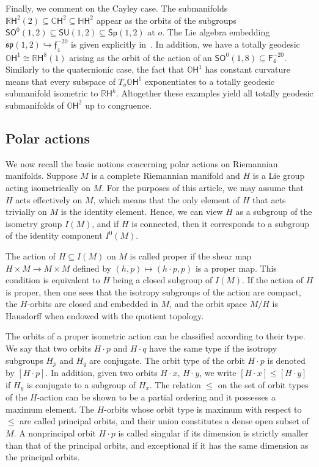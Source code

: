 \documentclass[12pt, a4paper]{amsart}
\newcommand{\g}{\mathfrak}
\newcommand{\s}{\mathsf}
\newcommand{\R}{\mathbb{R}}
\newcommand{\C}{\mathbb{C}}
\renewcommand{\H}{\mathbb{H}}
\renewcommand{\O}{\mathbb{O}}
\theoremstyle{definition}
\begin{document}
Finally, we comment on the Cayley case.
The submanifolds $\R\s{H}^2(2)\subseteq \C\s{H}^2\subseteq \H\s{H}^2$ appear as the orbits of the subgroups $\s{SO}^0(1,2)\subseteq \s{SU}(1,2)\subseteq \s{Sp}(1,2)$ at $o$.
The Lie algebra embedding $\g{sp}(1,2)\hookrightarrow\g{f}_4^{-20}$ is given explicitly in~\cite[Proposition~5.3]{kollross-octonions}.
In addition, we have a totally geodesic $\O\s{H}^1\cong \R\s{H}^8(1)$ arising as the orbit of the action of an $\s{SO}^0(1,8)\subseteq \s{F}_4^{-20}$.
Similarly to the quaternionic case, the fact that $\O\s{H}^1$ has constant curvature means that every subspace of $T_o\O\s{H}^1$ exponentiates to a totally geodesic submanifold isometric to $\R\s{H}^k$.
Altogether these examples yield all totally geodesic submanifolds of $\O\s{H}^2$
up to congruence.

\subsection{Polar actions}\label{sec:polar}\hfill

We now recall the basic notions concerning polar actions on Riemannian manifolds.
Suppose $M$ is a complete Riemannian manifold and $H$ is a Lie group acting isometrically on $M$.
For the purposes of this article, we may assume that $H$ acts effectively on $M$, which means that the only element of $H$ that acts trivially on $M$ is the identity element.
Hence, we can view $H$ as a subgroup of the isometry group $I(M)$, and if $H$ is connected, then it corresponds to a subgroup of the identity component $I^0(M)$.

The action of $H\subseteq I(M)$ on $M$ is called proper if the shear map $H\times M \to M \times M$ defined by $(h,p)\mapsto (h\cdot p, p)$ is a proper map.
This condition is equivalent to $H$ being a closed subgroup of $I(M)$.
If the action of $H$ is proper, then one sees that the isotropy subgroups of the action are compact, the $H$-orbits are closed and embedded in $M$, and the orbit space $M/H$ is Hausdorff when endowed with the quotient topology.

The orbits of a proper isometric action can be classified according to their type.
We say that two orbits $H\cdot p$ and $H\cdot q$ have the same type if the isotropy subgroups $H_p$ and $H_q$ are conjugate.
The orbit type of the orbit $H \cdot p$ is denoted by $[H\cdot p]$.
In addition, given two orbits $H\cdot x,\,H\cdot y$, we write $[H\cdot x]\leq [H\cdot y]$ if $H_y$ is conjugate to a subgroup of $H_x$.
The relation $\leq$ on the set of orbit types of the $H$-action can be shown to be a partial ordering and it possesses a maximum element.
The $H$-orbits whose orbit type is maximum with respect to $\leq$ are called principal orbits,
and their union constitutes a dense open subset of $M$.
A nonprincipal orbit $H\cdot p$ is called singular if its dimension is strictly smaller than that of the principal orbits,
and exceptional if it has the same dimension as the principal orbits.
\end{document}
